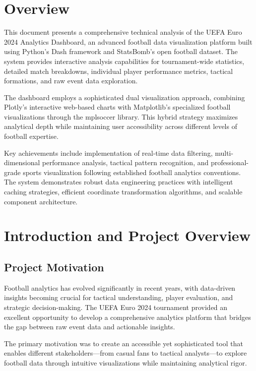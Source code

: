 \documentclass[12pt,a4paper]{article}
\begin{document}
\tableofcontents
\newpage

\section{Overview}

This document presents a comprehensive technical analysis of the UEFA Euro 2024 Analytics Dashboard, an advanced football data visualization platform built using Python's Dash framework and StatsBomb's open football dataset. The system provides interactive analysis capabilities for tournament-wide statistics, detailed match breakdowns, individual player performance metrics, tactical formations, and raw event data exploration.

The dashboard employs a sophisticated dual visualization approach, combining Plotly's interactive web-based charts with Matplotlib's specialized football visualizations through the mplsoccer library. This hybrid strategy maximizes analytical depth while maintaining user accessibility across different levels of football expertise.

Key achievements include implementation of real-time data filtering, multi-dimensional performance analysis, tactical pattern recognition, and professional-grade sports visualization following established football analytics conventions. The system demonstrates robust data engineering practices with intelligent caching strategies, efficient coordinate transformation algorithms, and scalable component architecture.

\section{Introduction and Project Overview}

\subsection{Project Motivation}

Football analytics has evolved significantly in recent years, with data-driven insights becoming crucial for tactical understanding, player evaluation, and strategic decision-making. The UEFA Euro 2024 tournament provided an excellent opportunity to develop a comprehensive analytics platform that bridges the gap between raw event data and actionable insights.

The primary motivation was to create an accessible yet sophisticated tool that enables different stakeholders—from casual fans to tactical analysts—to explore football data through intuitive visualizations while maintaining analytical rigor.
\end{document}
